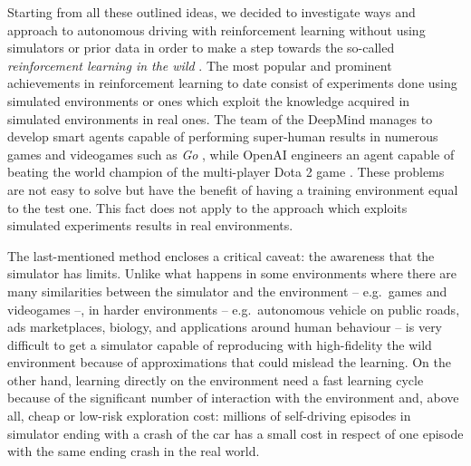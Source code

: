 Starting from all these outlined ideas, we decided to investigate ways and approach to autonomous driving with reinforcement learning without using simulators or prior data in order to make a step towards the so-called \textit{reinforcement learning in the wild} \cite{chara2018wild}. The most popular and prominent achievements in reinforcement learning to date consist of experiments done using simulated environments or ones which exploit the knowledge acquired in simulated environments in real ones.
The team of the DeepMind manages to develop smart agents capable of performing super-human results in numerous games and videogames such as \textit{Go} \cite{silver2016mastering,silver2017mastering}, while OpenAI engineers an agent capable of beating the world champion of the multi-player Dota 2 game \cite{openai2018dota,openai2019dota}.  These problems are not easy to solve but have the benefit of having a training environment equal to the test one. This fact does not apply to the approach which exploits simulated experiments results in real environments.

The last-mentioned method encloses a critical caveat: the awareness that the simulator has limits.
Unlike what happens in some environments where there are many similarities between the simulator and the environment -- e.g.\ games and videogames --, in harder environments -- e.g.\ autonomous vehicle on public roads, ads marketplaces, biology, and applications around human behaviour -- is very difficult to get a simulator capable of reproducing with  high-fidelity the wild environment because of approximations that could mislead the learning.
On the other hand, learning directly on the environment need a fast learning cycle because of the significant number of interaction with the environment and, above all, cheap or low-risk exploration cost: millions of self-driving episodes in simulator ending with a crash of the car has a small cost in respect of one episode with the same ending crash in the real world.

